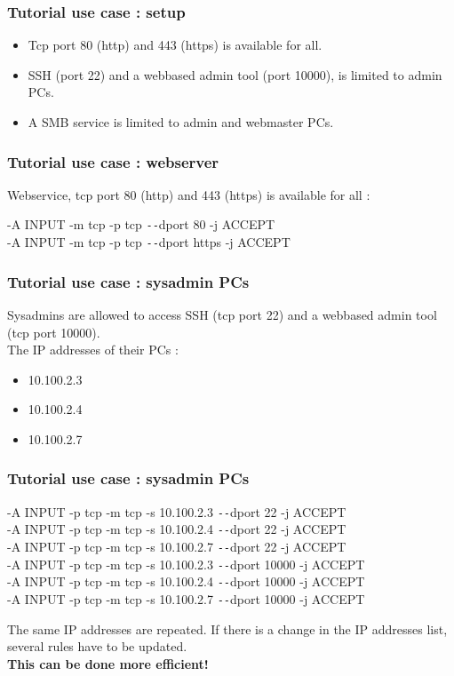 \documentclass[14pt]{beamer}
\newcommand{\dd}{{\texttt{-{}-}}}
\begin{document}
  \begin{frame}
    \frametitle{Tutorial use case : setup}
    \begin{itemize}
      \item Tcp port 80 (http) and 443 (https) is available for all.
      \item SSH (port 22) and a webbased admin tool (port 10000), is limited to admin PCs.
      \item A SMB service is limited to admin and webmaster PCs.
    \end{itemize}
  \end{frame}
  \begin{frame}
    \frametitle{Tutorial use case : webserver}
    Webservice, tcp port 80 (http) and 443 (https) is available for all :
    \begin{example}
      \small{-A INPUT -m tcp -p tcp \dd dport 80 -j ACCEPT\\
      -A INPUT -m tcp -p tcp \dd dport https -j ACCEPT}
    \end{example}
  \end{frame}
  \begin{frame}
    \frametitle{Tutorial use case : sysadmin PCs}
    Sysadmins are allowed to access SSH (tcp port 22) and a webbased admin tool (tcp port 10000).\\
    The IP addresses of their PCs :
    \begin{itemize}
	\item 10.100.2.3
	\item 10.100.2.4
	\item 10.100.2.7
    \end{itemize}
  \end{frame}
  \begin{frame}
    \frametitle{Tutorial use case : sysadmin PCs}
    \begin{example}
      \small{-A INPUT -p tcp -m tcp -s 10.100.2.3 \dd dport 22 -j ACCEPT\\
      -A INPUT -p tcp -m tcp -s 10.100.2.4 \dd dport 22 -j ACCEPT\\
      -A INPUT -p tcp -m tcp -s 10.100.2.7 \dd dport 22 -j ACCEPT\\
      -A INPUT -p tcp -m tcp -s 10.100.2.3 \dd dport 10000 -j ACCEPT\\
      -A INPUT -p tcp -m tcp -s 10.100.2.4 \dd dport 10000 -j ACCEPT\\
      -A INPUT -p tcp -m tcp -s 10.100.2.7 \dd dport 10000 -j ACCEPT}
    \end{example}
    \pause
    The same IP addresses are repeated. If there is a change in the IP addresses list, several rules have to be updated.\\
    \pause
    \textbf{This can be done more efficient!}
  \end{frame}
\end{document}
